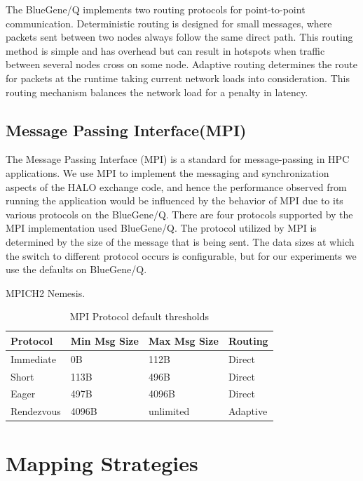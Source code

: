 \documentclass{acm_proc_article-sp}
\begin{document}
The BlueGene/Q implements two routing protocols for point-to-point communication.
Deterministic routing is designed for small messages, where packets sent between two nodes always follow the same direct path.
This routing method is simple and has overhead but can result in hotspots
when traffic between several nodes cross on some node.
Adaptive routing determines the route for packets at the runtime taking current network loads into consideration.
This routing mechanism balances the network load for a penalty in latency.


\subsection{Message Passing Interface(MPI)}
The Message Passing Interface (MPI) is a standard for message-passing in HPC applications.
We use MPI to implement the messaging and synchronization aspects of the HALO exchange code,
and hence the performance observed from running the application would be influenced by the behavior of MPI due to its various protocols on the BlueGene/Q.
There are four protocols supported by the MPI implementation used BlueGene/Q.
The protocol utilized by MPI is determined by the size of the message that is being sent.
The data sizes at which the switch to different protocol occurs is configurable, but for our experiments we use the defaults on BlueGene/Q.

MPICH2 Nemesis.

\begin{table}
  \caption{MPI Protocol default thresholds}
  {\footnotesize
    \begin{tabular}{ | l | l | l | p{1.5cm} |}
    \hline
    Protocol   & Min Msg Size   & Max Msg Size  & Routing\\ \hline
    Immediate  &             0B &           112B & Direct\\ \hline
    Short      &           113B &           496B & Direct\\ \hline
    Eager      &           497B &          4096B & Direct\\ \hline
    Rendezvous &          4096B &      unlimited & Adaptive\\ \hline
    \hline
    \end{tabular}
  }
\end{table}

\section{Mapping Strategies}
\end{document}
